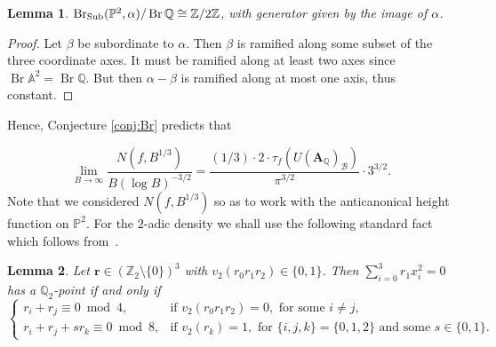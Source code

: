 \documentclass[a4paper,12pt,reqno]{amsart}
\numberwithin{equation}{section} \numberwithin{figure}{section}
\DeclareMathOperator{\Br}{Br} \DeclareMathOperator{\Brnr}{Br_{nr}}
\renewcommand\P{\mathbb{P}}
\newcommand\Z{\mathbb{Z}}
\newcommand\Q{\mathbb{Q}}
\newcommand{\Adele}{\mathbf{A}}
\newcommand{\br}{\mathscr{B}}
\newcommand{\A}{\mathbb{A}}
\renewcommand{\b}{\mathbf}
\renewcommand{\#}{\sharp}
\newtheorem{lemma}{Lemma}
\theoremstyle{definition}
\numberwithin{lemma}{section}
\newcommand{\beq}[2]
{
\begin{equation}
\label{#1}
{#2}
\end{equation}
}
\begin{document}
\begin{lemma}
	$\Sub(\P^2,\alpha)/\Br \Q \cong \Z/2\Z$, with generator given by the image of $\alpha$.
\end{lemma}
\begin{proof}
	Let $\beta$ be subordinate to $\alpha$. Then $\beta$ is ramified along
	some subset of the three coordinate axes. 
	It must be ramified along at least two axes since $\Br \A^2 = \Br \Q$. 
	But then
	$\alpha - \beta$ is ramified along at most one axis, thus constant.
\end{proof}
Hence, 	Conjecture \ref{conj:Br} predicts that
\beq{eq:bachactustrgcs}
{
\lim_{B\to \infty } \frac{N(f,B^{1/3} )}{B (\log B)^{-3/2}}
=
  \frac{(1/3) \cdot 2  \cdot  \tau_f(U(\Adele_\Q)_{\br})}
	{\pi^{3/2} } \cdot  3^{3/2}  
 .} Note that we considered $N(f,B^{1/3})$ so as to work with the anticanonical height function on $\P^2$.
For the $2$-adic density  we  shall 
use  the following standard fact which follows from~\cite[pg~79-80, Theorem 4.1, Lemma 4.3]{MR522835}.
\begin{lemma}
\label{lem:qq22} Let  $\b  r \in (\Z_2\setminus \{0\} )^3$ with $v_2(r_0r_1r_2) \in \{0,1\}$. Then $\sum_{i=0}^3 r_1 x_i^2=0$ has a $\Q_2$-point 
if and only if
$$\begin{cases}
	r_i+r_j \equiv 0 \bmod 4, & \text{if } v_2(r_0r_1r_2) = 0, \text{ for some } i \neq j, \\
	r_i+r_j+s r_k \equiv 0 \bmod 8, & \text{if } v_2(r_k) = 1, \text{ for } \{i,j,k\}=\{0,1,2\}
	\text{ and some } s \in \{0,1\}.
\end{cases}$$
\end{lemma} 
\end{document}
